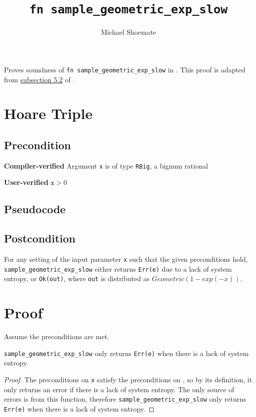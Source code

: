 \documentclass{article}
\title{\texttt{fn sample\_geometric\_exp\_slow}}
\author{Michael Shoemate}
\begin{document}
 
\maketitle 
 
Proves soundness of \texttt{fn sample\_geometric\_exp\_slow} in . 
This proof is adapted from \href{https://arxiv.org/pdf/2004.00010.pdf#subsection.5.2}{subsection 5.2} of \cite{CKS20}. 
 
\section{Hoare Triple} 
\subsection*{Precondition} 
\textbf{Compiler-verified} 
Argument \texttt{x} is of type \texttt{RBig}, a bignum rational 
 
\textbf{User-verified} 
$\texttt{x} > 0$ 
 
\subsection*{Pseudocode}         
 
 
\subsection*{Postcondition}\label{postcondition} 
For any setting of the input parameter \texttt{x} such that the given preconditions hold, \\ 
\texttt{sample\_geometric\_exp\_slow} either returns \texttt{Err(e)} due to a lack of system entropy, 
or \texttt{Ok(out)}, where \texttt{out} is distributed as $Geometric(1 - exp(-x))$. 
 
\section{Proof} 
Assume the preconditions are met. 
 
\begin{lemma}\label{err-e} 
    \texttt{sample\_geometric\_exp\_slow} only returns \texttt{Err(e)} when there is a lack of system entropy. 
\end{lemma} 
 
\begin{proof} 
    The preconditions on \texttt{x} satisfy the preconditions on , 
    so by its definition, it only returns an error if there is a lack of system entropy. 
    The only source of errors is from this function, 
    therefore \texttt{sample\_geometric\_exp\_slow} only returns \texttt{Err(e)} when there is a lack of system entropy. 
\end{proof} 
 
\end{document}
